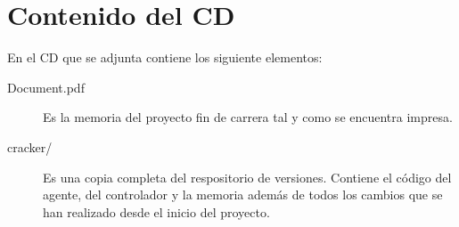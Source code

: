 \chapter{Contenido del CD}

En el CD que se adjunta contiene los siguiente elementos:

\begin{description}
	\item[Document.pdf] Es la memoria del proyecto fin de carrera tal y como se encuentra impresa.
	
	\item[cracker/] Es una copia completa del respositorio de versiones. Contiene el código del agente, del controlador y la memoria además de todos los cambios que se han realizado desde el inicio del proyecto.
\end{description}